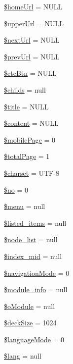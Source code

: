 \begin{DoxyCompactItemize}
\item 
\hyperlink{classmobileXE_abff078bb36c02394447e55be4500b762}{\$home\+Url} = N\+U\+L\+L
\item 
\hyperlink{classmobileXE_a643b9ca5393066afea26819e4f1cf115}{\$upper\+Url} = N\+U\+L\+L
\item 
\hyperlink{classmobileXE_adbdb5909b975bb776f91817d2392aaca}{\$next\+Url} = N\+U\+L\+L
\item 
\hyperlink{classmobileXE_acbc08c3fe06a6a5aaae6cbdc8738559f}{\$prev\+Url} = N\+U\+L\+L
\item 
\hyperlink{classmobileXE_adac4ec3b5f46d10ac063ccba83f8ffa7}{\$etc\+Btn} = N\+U\+L\+L
\item 
\hyperlink{classmobileXE_ae641a3f98d4d95afe77f56456532aff7}{\$childs} = null
\item 
\hyperlink{classmobileXE_aeb2ef82029883fd60174e3d0e9f7dcc3}{\$title} = N\+U\+L\+L
\item 
\hyperlink{classmobileXE_a827bc8119bac862a05a1c192125bf125}{\$content} = N\+U\+L\+L
\item 
\hyperlink{classmobileXE_a4017307825d19d450c677b25b70eab5e}{\$mobile\+Page} = 0
\item 
\hyperlink{classmobileXE_a0d7bcada3689f84f67337d02c8dd6f21}{\$total\+Page} = 1
\item 
\hyperlink{classmobileXE_ae49d948fe651953a56bac2a907f6057a}{\$charset} = \textquotesingle{}U\+T\+F-\/8\textquotesingle{}
\item 
\hyperlink{classmobileXE_a497e828014cdb6eaef56dd42d0f816e6}{\$no} = 0
\item 
\hyperlink{classmobileXE_a0ebb4296d28c9cb49fabb4d1252c1434}{\$menu} = null
\item 
\hyperlink{classmobileXE_abd07e5909154b43a31e2ebff5d51e4c7}{\$listed\+\_\+items} = null
\item 
\hyperlink{classmobileXE_af906479c52f412d0beae2252bad4ef35}{\$node\+\_\+list} = null
\item 
\hyperlink{classmobileXE_a9e93ed38eed50085338e8128ab4015ab}{\$index\+\_\+mid} = null
\item 
\hyperlink{classmobileXE_aa6e85b2d6fe4667d7d0a3a2b3f13bd12}{\$navigation\+Mode} = 0
\item 
\hyperlink{classmobileXE_a926916a0195e056ccfdaf284e56b0ea6}{\$module\+\_\+info} = null
\item 
\hyperlink{classmobileXE_a64908b5e1d46537b4739036b1a00b689}{\$o\+Module} = null
\item 
\hyperlink{classmobileXE_a3d9450dc37a10f7bb11801ab29c000ed}{\$deck\+Size} = 1024
\item 
\hyperlink{classmobileXE_a70ee01279ea1bcdd609905e80e4544b7}{\$language\+Mode} = 0
\item 
\hyperlink{classmobileXE_a126d781fe75edb57ef2718f5a6e26d82}{\$lang} = null
\end{DoxyCompactItemize}



